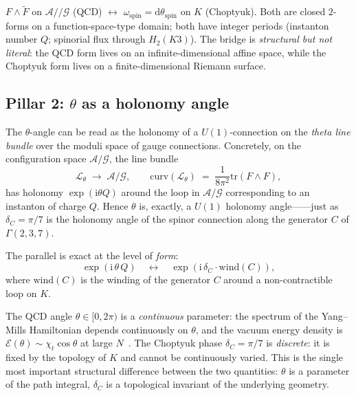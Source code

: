 \documentclass[11pt,a4paper]{article}
\newcommand{\dC}{\delta_C}
\providecommand{\dd}{}
\renewcommand{\dd}{\mathrm{d}}
\providecommand{\ii}{}
\renewcommand{\ii}{\mathrm{i}}
\renewcommand{\tr}{\mathrm{tr}}
\theoremstyle{plain}
\theoremstyle{definition}
\theoremstyle{remark}
\begin{document}
\begin{keyfind}
$F\wedge\tilde F$ on $\mathcal{A}/\!\!/\mathcal{G}$ (QCD) $\leftrightarrow$
$\omega_{\mathrm{spin}} = \dd\theta_{\mathrm{spin}}$ on $K$ (Choptyuk).
Both are closed $2$-forms on a function-space-type domain; both have
integer periods (instanton number $Q$; spinorial flux through
$H_2(K3)$).  The bridge is \emph{structural but not literal}: the QCD
form lives on an infinite-dimensional affine space, while the Choptyuk
form lives on a finite-dimensional Riemann surface.
\end{keyfind}

\subsection{Pillar 2: $\theta$ as a holonomy angle}\label{ssec:pillar2}

The $\theta$-angle can be read as the holonomy of a $U(1)$-connection
on the \emph{theta line bundle} over the moduli space of gauge
connections.  Concretely, on the configuration space
$\mathcal{A}/\mathcal{G}$, the line bundle
\begin{equation}
  \mathcal{L}_\theta \;\longrightarrow\; \mathcal{A}/\mathcal{G}, \qquad
  \mathrm{curv}(\mathcal{L}_\theta) \;=\; \frac{1}{8\pi^2}\tr(F\wedge F),
\end{equation}
has holonomy $\exp(\ii\theta Q)$ around the loop in
$\mathcal{A}/\mathcal{G}$ corresponding to an instanton of charge $Q$.
Hence $\theta$ is, exactly, a $U(1)$ holonomy angle——just as
$\dC = \pi/7$ is the holonomy angle of the spinor connection along the
generator $C$ of $\Gamma(2,3,7)$.

The parallel is exact at the level of \emph{form}:
\begin{equation}
  \exp(\ii\,\theta\,Q) \quad\leftrightarrow\quad
  \exp(\ii\,\dC\cdot\mathrm{wind}(C)),
\end{equation}
where $\mathrm{wind}(C)$ is the winding of the generator $C$ around a
non-contractible loop on $K$.

\begin{caveat}
The QCD angle $\theta\in[0,2\pi)$ is a \emph{continuous} parameter:
the spectrum of the Yang--Mills Hamiltonian depends continuously on
$\theta$, and the vacuum energy density is
$\mathcal{E}(\theta) \sim \chi_t \cos\theta$ at large
$N$~\cite{witten1998theta}.  The Choptyuk phase $\dC = \pi/7$ is
\emph{discrete}: it is fixed by the topology of $K$ and cannot be
continuously varied.  This is the single most important structural
difference between the two quantities: $\theta$ is a parameter of the
path integral, $\dC$ is a topological invariant of the underlying
geometry.
\end{caveat}
\end{document}

